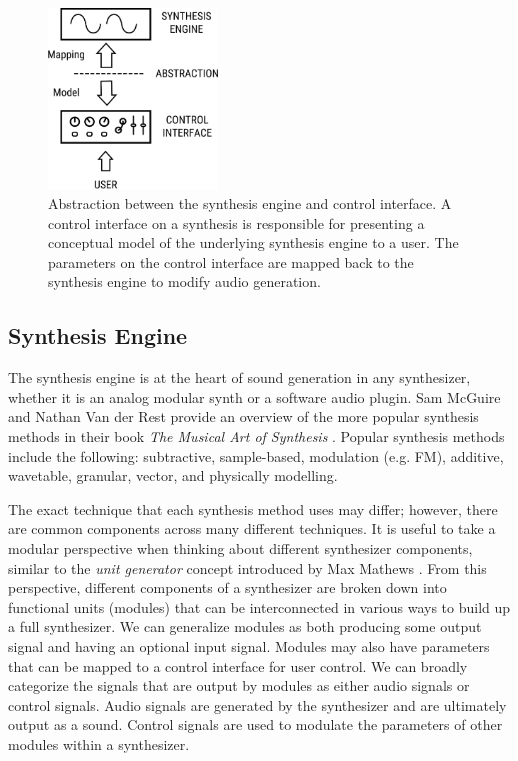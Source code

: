 \begin{figure}[ht]
    \centering
    \includegraphics[width=0.4\textwidth]{figures/background/Synth Abstraction Model.pdf}
    \caption{Abstraction between the synthesis engine and control interface. A control interface on a synthesis is responsible for presenting a conceptual model of the underlying synthesis engine to a user. The parameters on the control interface are mapped back to the synthesis engine to modify audio generation.}
    \label{fig:synth_abstraction}
\end{figure}

\subsection{Synthesis Engine}
The synthesis engine is at the heart of sound generation in any synthesizer, whether it is an analog modular synth or a software audio plugin. Sam McGuire and Nathan Van der Rest provide an overview of the more popular synthesis methods in their book \textit{The Musical Art of Synthesis} \cite{mcguire2015musical}. Popular synthesis methods include the following: subtractive, sample-based, modulation (e.g. FM), additive, wavetable, granular, vector, and physically modelling. 

The exact technique that each synthesis method uses may differ; however, there are common components across many different techniques. It is useful to take a modular perspective when thinking about different synthesizer components, similar to the \textit{unit generator} concept introduced by Max Mathews \cite{roads1980interview}. From this perspective, different components of a synthesizer are broken down into functional units (modules) that can be interconnected in various ways to build up a full synthesizer. We can generalize modules as both producing some output signal and having an optional input signal. Modules may also have parameters that can be mapped to a control interface for user control. We can broadly categorize the signals that are output by modules as either audio signals or control signals. Audio signals are generated by the synthesizer and are ultimately output as a sound. Control signals are used to modulate the parameters of other modules within a synthesizer.

